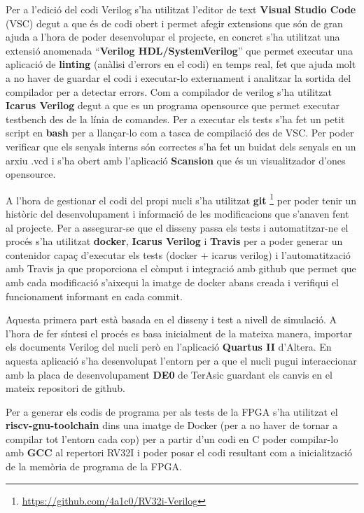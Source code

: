 \documentclass[10pt,a4paper,twocolumn,twoside]{article}
\begin{document}
Per a l'edició del codi Verilog s'ha utilitzat l'editor de text \textbf{Visual Studio Code} (VSC) degut a que és de codi obert i permet afegir extensions que són de gran ajuda a l'hora de poder desenvolupar el projecte, en concret s'ha utilitzat una extensió anomenada ``\textbf{Verilog HDL/SystemVerilog}'' que permet executar una aplicació de \textbf{linting} (anàlisi d'errors en el codi) en temps real, fet que ajuda molt a no haver de guardar el codi i executar-lo externament i analitzar la sortida del compilador per a detectar errors. Com a compilador de verilog s'ha utilitzat \textbf{Icarus Verilog} degut a que es un programa opensource que permet executar testbench des de la línia de comandes. Per a executar els tests s'ha fet un petit script en \textbf{bash} per a llançar-lo com a tasca de compilació des de VSC. Per poder verificar que els senyals interns són correctes s'ha fet un buidat dels senyals en un arxiu .vcd i s'ha obert amb l'aplicació \textbf{Scansion} que és un visualitzador d'ones opensource.

A l'hora de gestionar el codi del propi nucli s'ha utilitzat \textbf{git} \footnote{\href{https://github.com/4a1c0/RV32i-Verilog}{https://github.com/4a1c0/RV32i-Verilog}} per poder tenir un històric del desenvolupament i informació de les modificacions que s'anaven fent al projecte. Per a assegurar-se que el disseny passa els tests i automatitzar-ne el procés s'ha utilitzat \textbf{docker}, \textbf{Icarus Verilog} i \textbf{Travis} per a poder generar un contenidor capaç d'executar els tests (docker + icarus verilog) i l'automatització amb Travis ja que proporciona el còmput i integració amb github que permet que amb cada modificació s'aixequi la imatge de docker abans creada i verifiqui el funcionament informant en cada commit. 

Aquesta primera part està basada en el disseny i test a nivell de simulació. A l'hora de fer síntesi el procés es basa inicialment de la mateixa manera, importar els documents Verilog del nucli però en l'aplicació \textbf{Quartus II} d'Altera. En aquesta aplicació s'ha desenvolupat l'entorn per a que el nucli pugui interaccionar amb la placa de desenvolupament \textbf{DE0} de TerAsic guardant els canvis en el mateix repositori de github.

Per a generar els codis de programa per als tests de la FPGA s'ha utilitzat el \textbf{riscv-gnu-toolchain} dins una imatge de Docker (per a no haver de tornar a compilar tot l'entorn cada cop) per a partir d'un codi en C poder compilar-lo amb \textbf{GCC} al repertori RV32I i poder posar el codi resultant com a inicialització de la memòria de programa de la FPGA.
\end{document}
